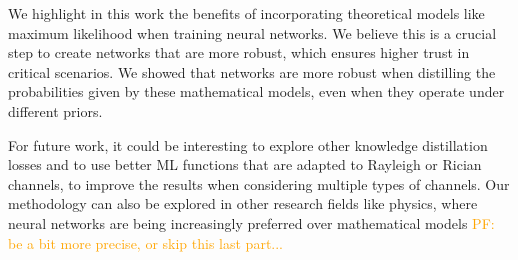 \documentclass[conference]{IEEEtran}
\newcommand{\pf}[1]{{\textcolor{orange}{PF: {#1}}}}
\begin{document}
We highlight in this work the benefits of incorporating theoretical models like maximum likelihood when training neural networks. We believe this is a crucial step to create networks that are more robust, which ensures higher trust in critical scenarios. We showed that networks are more robust when distilling the probabilities given by these mathematical models, even when they operate under different priors.

For future work, it could be interesting to explore other knowledge distillation losses and to use better ML functions that are adapted to Rayleigh or Rician channels, to improve the results when considering multiple types of channels. Our methodology can also be explored in other research fields like physics, where neural networks are being increasingly preferred over mathematical models \pf{be a bit more precise, or skip this last part...}



\end{document}
